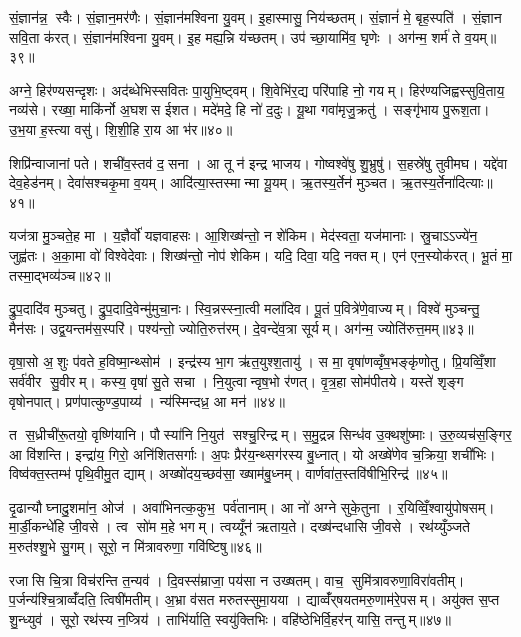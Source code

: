 सं॒ज्ञान॑न्न॒ स्वैः। सं॒ज्ञान॒मर॑णैः। सं॒ज्ञान॑मश्विना यु॒वम्। इ॒हास्मासु॒ निय॑च्छतम्। सं॒ज्ञानं॑ मे॒ बृह॒स्पति॑। सं॒ज्ञान सवि॒ता क॑रत्। सं॒ज्ञान॑मश्विना यु॒वम्। इ॒ह मह्य॒न्नि य॑च्छतम्। उप॑ च्छा॒यामि॑व॒ घृणेः। अग॑न्म॒ शर्म॑ ते व॒यम्॥३९॥

अग्ने॒ हिर॑ण्यसन्दृशः। अद॑ब्धेभिस्सवितः पा॒युभि॒ष्ट्वम्। शि॒वेभि॑र॒द्य परि॑पाहि नो॒ गयम्। हिर॑ण्यजिह्वस्सुवि॒ताय॒ नव्य॑से। रख्षा॒ माकि॑र्नो अ॒घशस ईशत। मदे॑मदे॒ हि नो॑ द॒दुः। यू॒था गवा॑मृजु॒क्रतु॑। सङ्गृ॑भाय पु॒रूश॒ता। उ॒भ॒या ह॒स्त्या वसु॑। शि॒शी॒हि रा॒य आ भ॑र॥४०॥

शिप्रि॑न्वाजानां पते। शची॑व॒स्तव॑ द॒सना। आ तू न॑ इन्द्र भाजय। गोष्वश्वे॑षु शु॒भ्रुषु॑। स॒हस्रे॑षु तुवीमघ। यद्दे॑वा देव॒हेड॑नम्। देवा॑सश्चकृ॒मा व॒यम्। आदि॑त्या॒स्तस्मान्मा यू॒यम्। ऋ॒तस्य॒र्तेन॑ मुञ्चत। ऋ॒तस्य॒र्तेना॑दित्याः॥४१॥

यज॑त्रा मु॒ञ्चते॒ह मा। य॒ज्ञैर्वो॑ यज्ञवाहसः। आ॒शिख्ष॑न्तो॒ न शे॑किम। मेद॑स्वता॒ यज॑मानाः। स्रु॒चाऽऽज्ये॑न॒ जुह्व॑तः। अ॒का॒मा वो॑ विश्वेदेवाः। शिख्ष॑न्तो॒ नोप॑ शेकिम। यदि॒ दिवा॒ यदि॒ नक्तम्। एन॑ एन॒स्योक॑रत्। भू॒तं मा॒ तस्मा॒द्भव्य॑ञ्च॥४२॥

द्रु॒प॒दादि॑व मुञ्चतु। द्रु॒प॒दादि॒वेन्मु॑मुचा॒नः। स्वि॒न्नस्स्ना॒त्वी मला॑दिव। पू॒तं प॒वित्रे॑णे॒वाज्यम्। विश्वे॑ मुञ्चन्तु॒ मैन॑सः। उद्व॒यन्तम॑स॒स्परि॑। पश्य॑न्तो॒ ज्योति॒रुत्त॑रम्। दे॒वन्दे॑व॒त्रा सूर्यम्। अग॑न्म॒ ज्योति॑रुत्त॒मम्॥४३॥\anuvakamend[तव॑ कृधि॒ वन॒स्पतीञ्जानता॒मस॑ति व॒यं भ॑रादित्याश्च॒ नव॑ च]

वृषा॒सो अ॒शुः प॑वते ह॒विष्मा॒न्थ्सोम॑। इन्द्र॑स्य भा॒ग ऋ॑त॒युश्श॒तायु॑। स मा॒ वृषा॑णव्वृँष॒भङ्कृ॑णोतु। प्रि॒यव्विँ॒शा सर्व॑वीर सु॒वीरम्। कस्य॒ वृषा॑ सु॒ते सचा। नि॒युत्वान्वृष॒भो र॑णत्। वृ॒त्र॒हा सोम॑पीतये। यस्ते॑ शृङ्ग वृषोनपात्। प्रण॑पात्कुण्ड॒पाय्य॑। न्य॑स्मिन्दध्र॒ आ मन॑॥४४॥

त स॒ध्रीची॑रू॒तयो॒ वृष्णि॑यानि। पौस्या॑नि नि॒युत॑ सश्चु॒रिन्द्रम्। स॒मु॒द्रन्न सिन्ध॑व उ॒क्थशु॑ष्माः। उ॒रु॒व्यच॑स॒ङ्गिर॒ आ वि॑शन्ति। इन्द्रा॑य॒ गिरो॒ अनि॑शितसर्गाः। अ॒पः प्रैर॑य॒न्थ्सग॑रस्य बु॒ध्नात्। यो अख्षे॑णेव च॒क्रिया॒ शची॑भिः। विष्व॑क्त॒स्तम्भ॑ पृथि॒वीमु॒त द्याम्। अख्षो॑दय॒च्छव॑सा॒ ख्षाम॑बु॒ध्नम्। वार्णवा॑त॒स्तवि॑षीभि॒रिन्द्र॑॥४५॥

दृ॒ढान्यौघ्नादु॒शमा॑न॒ ओज॑। अवा॑भिनत्क॒कुभ॒ पर्व॑तानाम्। आ नो॑ अग्ने सुके॒तुना। र॒यिव्विँ॒श्वायु॑पोषसम्। मा॒र्डी॒कन्धे॑हि जी॒वसे। त्व सो॑म म॒हे भगम्। त्वय्यूँन॑ ऋताय॒ते। दख्ष॑न्दधासि जी॒वसे। रथ॑य्युँञ्जते म॒रुत॑श्शु॒भे सु॒गम्। सूरो॒ न मि॑त्रावरुणा॒ गवि॑ष्टिषु॥४६॥

रजासि चि॒त्रा विच॑रन्ति त॒न्यव॑। दि॒वस्स॑म्राजा॒ पय॑सा न उख्षतम्। वाच॒ सुमि॑त्रावरुणा॒विरा॑वतीम्। प॒र्जन्य॑श्चि॒त्राव्वँ॑दति॒ त्विषी॑मतीम्। अ॒भ्रा व॑सत मरुतस्सुमा॒यया। द्याव्वँ॑र्‌षयतमरु॒णाम॑रे॒पसम्। अयु॑क्त स॒प्त शु॒न्ध्युव॑। सूरो॒ रथ॑स्य न॒प्त्रिय॑। ताभि॑र्याति॒ स्वयु॑क्तिभिः। वहि॑ष्ठेभिर्\mbox{}वि॒हर॑न् यासि॒ तन्तुम्॥४७॥

